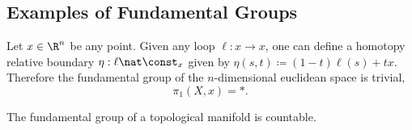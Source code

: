 
\subsection{Examples of Fundamental Groups}

\begin{example}
\label{exp:euclidean-space-pi1-is-trivial}
Let \(x \in \R^n\) be any point. Given any loop \(\ell: x \to x\), one can
define a homotopy relative boundary \(\eta: \ell \nat \const_x\) given by
\(\eta(s, t) \coloneq (1 - t) \ell(s) + t x\). Therefore the fundamental group
of the \(n\)-dimensional euclidean space is trivial,
\[
\pi_1(X, x) = *.
\]
\end{example}

\begin{proposition}
\label{prop:pi1-manifold-is-countable}
The fundamental group of a topological manifold is countable.
\end{proposition}

